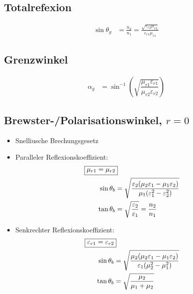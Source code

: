 \subsection{Totalrefexion}
\begin{align*}
    \sin\theta_g & = \frac{n_2}{n_1} = \frac{\sqrt{\varepsilon_{r2}\mu_{r2}}}{\varepsilon_{r1}\mu_{r1}}
\end{align*}

\subsection{Grenzwinkel}
\begin{align*}
    \alpha_g & = \sin^{-1} \left( \sqrt{ \dfrac{\mu_{r1} \varepsilon_{r1}}{\mu_{r2} \varepsilon_{r2}}} \right)
\end{align*}
\subsection{Brewster-/Polarisationswinkel, $r=0$}
\begin{itemize}
    \item Snelliusche Brechungsgesetz
    \item Paralleler Reflexionskoeffizient:
          \begin{align*}
              \Aboxed{\mu_{r1}=\mu_{r2}}                                                                                                    \\
              \sin\theta_b & = \sqrt{\frac{\varepsilon_2(\mu_2\varepsilon_1 - \mu_1\varepsilon_2)}{\mu_1(\varepsilon_1^2-\varepsilon_2^2)}} \\
              \tan\theta_b & = \sqrt{\frac{\varepsilon_2}{\varepsilon_1}} = \frac{n_2}{n_1}
          \end{align*}

    \item Senkrechter Reflexionskoeffizient:
          \begin{align*}
              \Aboxed{\varepsilon_{r1}=\varepsilon_{r2}}                                                                    \\
              \sin\theta_b & = \sqrt{\frac{\mu_2(\mu_2\varepsilon_1 - \mu_1\varepsilon_2)}{\varepsilon_1(\mu_2^2-\mu_1^2)}} \\
              \tan\theta_b & = \sqrt{\frac{\mu_2}{\mu_1+\mu_2}}
          \end{align*}
\end{itemize}

